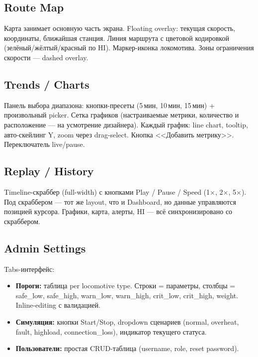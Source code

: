\documentclass[12pt,a4paper]{article}
\begin{document}
\subsection{Route Map}

Карта занимает основную часть экрана. Floating overlay: текущая скорость, координаты, ближайшая станция. Линия маршрута с цветовой кодировкой (зелёный/жёлтый/красный по HI). Маркер-иконка локомотива. Зоны ограничения скорости --- dashed overlay.

\subsection{Trends / Charts}

Панель выбора диапазона: кнопки-пресеты (5\,мин, 10\,мин, 15\,мин) + произвольный picker. Сетка графиков (настраиваемые метрики, количество и расположение --- на усмотрение дизайнера). Каждый график: line chart, tooltip, авто-скейлинг Y, zoom через drag-select. Кнопка <<Добавить метрику>>. Переключатель live/pause.

\subsection{Replay / History}

Timeline-скраббер (full-width) с кнопками Play / Pause / Speed (1$\times$, 2$\times$, 5$\times$). Под скраббером --- тот же layout, что и Dashboard, но данные управляются позицией курсора. Графики, карта, алерты, HI --- всё синхронизировано со скраббером.

\subsection{Admin Settings}

Tabs-интерфейс:
\begin{itemize}[nosep]
  \item \textbf{Пороги:} таблица per locomotive type. Строки = параметры, столбцы = safe\_low, safe\_high, warn\_low, warn\_high, crit\_low, crit\_high, weight. Inline-editing с валидацией.
  \item \textbf{Симуляция:} кнопки Start/Stop, dropdown сценариев (normal, overheat, fault, highload, connection\_loss), индикатор текущего статуса.
  \item \textbf{Пользователи:} простая CRUD-таблица (username, role, reset password).
\end{itemize}


\end{document}
